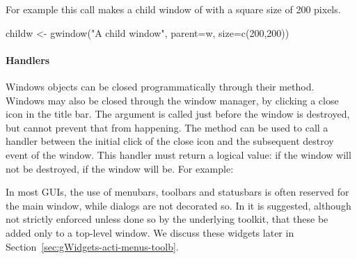 For example this call makes a child window of  with a square
size of 200 pixels.
\begin{Schunk}
\begin{Sinput}
 childw <- gwindow("A child window", parent=w, size=c(200,200))
\end{Sinput}
\end{Schunk}


\paragraph{Handlers}
Windows objects can be closed programmatically through their
 method. Windows may also be closed through
the window manager, by clicking a close icon in the title bar.  The
 argument is called just before the window
is destroyed, but cannot prevent that from happening.  The
 method can be used to call a
handler between the initial click of the close icon and the subsequent
destroy event of the window. This handler must return a logical value:
if  the window will not be destroyed, if  the
window will be. For example:

\begin{Schunk}
\end{Schunk}

In most GUIs,  the use of menubars, toolbars and
statusbars is often reserved for the main window, while dialogs are
not decorated so.  In  it is suggested, although not
strictly enforced unless done so by the underlying toolkit, that these be
added only to a top-level window.  We discuss these widgets later in
Section~\ref{sec:gWidgets-acti-menus-toolb}. 

